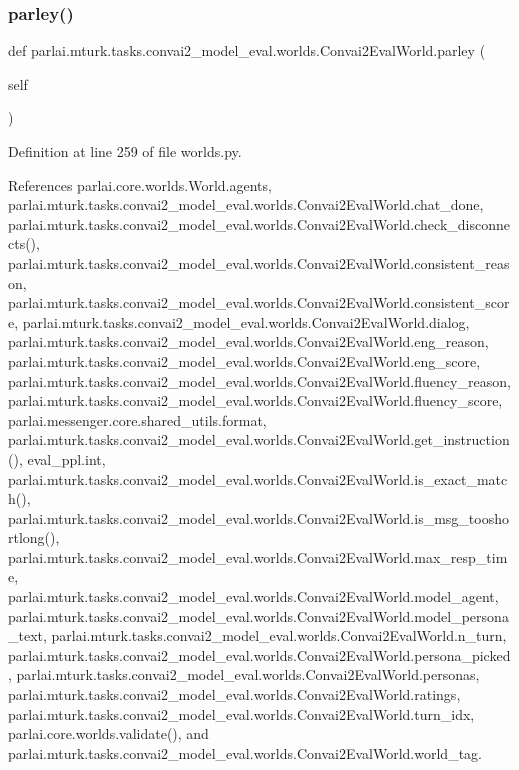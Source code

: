 \subsubsection{\texorpdfstring{parley()}{parley()}}
{\footnotesize\ttfamily def parlai.\+mturk.\+tasks.\+convai2\+\_\+model\+\_\+eval.\+worlds.\+Convai2\+Eval\+World.\+parley (\begin{DoxyParamCaption}\item[{}]{self }\end{DoxyParamCaption})}



Definition at line 259 of file worlds.\+py.



References parlai.\+core.\+worlds.\+World.\+agents, parlai.\+mturk.\+tasks.\+convai2\+\_\+model\+\_\+eval.\+worlds.\+Convai2\+Eval\+World.\+chat\+\_\+done, parlai.\+mturk.\+tasks.\+convai2\+\_\+model\+\_\+eval.\+worlds.\+Convai2\+Eval\+World.\+check\+\_\+disconnects(), parlai.\+mturk.\+tasks.\+convai2\+\_\+model\+\_\+eval.\+worlds.\+Convai2\+Eval\+World.\+consistent\+\_\+reason, parlai.\+mturk.\+tasks.\+convai2\+\_\+model\+\_\+eval.\+worlds.\+Convai2\+Eval\+World.\+consistent\+\_\+score, parlai.\+mturk.\+tasks.\+convai2\+\_\+model\+\_\+eval.\+worlds.\+Convai2\+Eval\+World.\+dialog, parlai.\+mturk.\+tasks.\+convai2\+\_\+model\+\_\+eval.\+worlds.\+Convai2\+Eval\+World.\+eng\+\_\+reason, parlai.\+mturk.\+tasks.\+convai2\+\_\+model\+\_\+eval.\+worlds.\+Convai2\+Eval\+World.\+eng\+\_\+score, parlai.\+mturk.\+tasks.\+convai2\+\_\+model\+\_\+eval.\+worlds.\+Convai2\+Eval\+World.\+fluency\+\_\+reason, parlai.\+mturk.\+tasks.\+convai2\+\_\+model\+\_\+eval.\+worlds.\+Convai2\+Eval\+World.\+fluency\+\_\+score, parlai.\+messenger.\+core.\+shared\+\_\+utils.\+format, parlai.\+mturk.\+tasks.\+convai2\+\_\+model\+\_\+eval.\+worlds.\+Convai2\+Eval\+World.\+get\+\_\+instruction(), eval\+\_\+ppl.\+int, parlai.\+mturk.\+tasks.\+convai2\+\_\+model\+\_\+eval.\+worlds.\+Convai2\+Eval\+World.\+is\+\_\+exact\+\_\+match(), parlai.\+mturk.\+tasks.\+convai2\+\_\+model\+\_\+eval.\+worlds.\+Convai2\+Eval\+World.\+is\+\_\+msg\+\_\+tooshortlong(), parlai.\+mturk.\+tasks.\+convai2\+\_\+model\+\_\+eval.\+worlds.\+Convai2\+Eval\+World.\+max\+\_\+resp\+\_\+time, parlai.\+mturk.\+tasks.\+convai2\+\_\+model\+\_\+eval.\+worlds.\+Convai2\+Eval\+World.\+model\+\_\+agent, parlai.\+mturk.\+tasks.\+convai2\+\_\+model\+\_\+eval.\+worlds.\+Convai2\+Eval\+World.\+model\+\_\+persona\+\_\+text, parlai.\+mturk.\+tasks.\+convai2\+\_\+model\+\_\+eval.\+worlds.\+Convai2\+Eval\+World.\+n\+\_\+turn, parlai.\+mturk.\+tasks.\+convai2\+\_\+model\+\_\+eval.\+worlds.\+Convai2\+Eval\+World.\+persona\+\_\+picked, parlai.\+mturk.\+tasks.\+convai2\+\_\+model\+\_\+eval.\+worlds.\+Convai2\+Eval\+World.\+personas, parlai.\+mturk.\+tasks.\+convai2\+\_\+model\+\_\+eval.\+worlds.\+Convai2\+Eval\+World.\+ratings, parlai.\+mturk.\+tasks.\+convai2\+\_\+model\+\_\+eval.\+worlds.\+Convai2\+Eval\+World.\+turn\+\_\+idx, parlai.\+core.\+worlds.\+validate(), and parlai.\+mturk.\+tasks.\+convai2\+\_\+model\+\_\+eval.\+worlds.\+Convai2\+Eval\+World.\+world\+\_\+tag.

